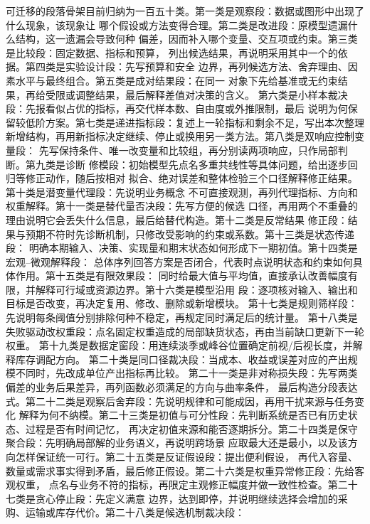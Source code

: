 可迁移的段落骨架目前归纳为一百五十类。第一类是观察段：数据或图形中出现了什么现象，该现象让
哪个假设或方法变得合理。第二类是改进段：原模型遗漏什么结构，这一遗漏会导致何种
偏差，因而补入哪个变量、交互项或约束。第三类是比较段：固定数据、指标和预算，
列出候选结果，再说明采用其中一个的依据。第四类是实验设计段：先写预算和安全
边界，再列候选方法、舍弃理由、因素水平与最终组合。第五类是成对结果段：在同一
对象下先给基准或无约束结果，再给受限或调整结果，最后解释差值对决策的含义。
第六类是小样本裁决段：先报看似占优的指标，再交代样本数、自由度或外推限制，最后
说明为何保留较低阶方案。第七类是递进指标段：复述上一轮指标和剩余不足，写出本次整理
新增结构，再用新指标决定继续、停止或换用另一类方法。第八类是双响应控制变量段：
先写保持条件、唯一改变量和比较组，再分别读两项响应，只作局部判断。第九类是诊断
修模段：初始模型先点名多重共线性等具体问题，给出逐步回归等修正动作，随后按相对
拟合、绝对误差和整体检验三个口径解释修正结果。第十类是潜变量代理段：先说明业务概念
不可直接观测，再列代理指标、方向和权重解释。第十一类是替代量否决段：先写方便的候选
口径，再用两个不重叠的理由说明它会丢失什么信息，最后给替代构造。第十二类是反常结果
修正段：结果与预期不符时先诊断机制，只修改受影响的约束或系数。第十三类是状态传递段：
明确本期输入、决策、实现量和期末状态如何形成下一期初值。第十四类是宏观--微观解释段：
总体序列回答方案是否闭合，代表时点说明状态和约束如何具体作用。第十五类是有限效果段：
同时给最大值与平均值，直接承认改善幅度有限，并解释可行域或资源边界。第十六类是模型沿用
段：逐项核对输入、输出和目标是否改变，再决定复用、修改、删除或新增模块。
第十七类是规则筛样段：先说明每条阈值分别排除何种不稳定，再规定同时满足后的统计量。
第十八类是失败驱动改权重段：点名固定权重造成的局部缺货状态，再由当前缺口更新下一轮权重。
第十九类是数据定窗段：用连续淡季或峰谷位置确定前视/后视长度，并解释库存调配方向。
第二十类是同口径裁决段：当成本、收益或误差对应的产出规模不同时，先改成单位产出指标再比较。
第二十一类是非对称损失段：先写两类偏差的业务后果差异，再列函数必须满足的方向与曲率条件，
最后构造分段表达式。第二十二类是观察后舍弃段：先说明规律和可能成因，再用干扰来源与任务变化
解释为何不纳模。第二十三类是初值与可分性段：先判断系统是否已有历史状态、过程是否有时间记忆，
再决定初值来源和能否逐期拆分。第二十四类是保守聚合段：先明确局部解的业务语义，再说明跨场景
应取最大还是最小，以及该方向怎样保证统一可行。第二十五类是反证假设段：提出便利假设，
再代入容量、数量或需求事实得到矛盾，最后修正假设。第二十六类是权重异常修正段：先给客观权重，
点名与业务不符的指标，再限定主观修正幅度并做一致性检查。第二十七类是贪心停止段：先定义满意
边界，达到即停，并说明继续选择会增加的采购、运输或库存代价。第二十八类是候选机制裁决段：
